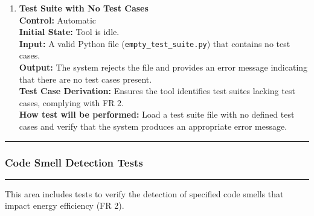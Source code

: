 \documentclass[12pt, titlepage]{article}
\newcommand{\colorrule}{\textcolor{BlueViolet}{\rule{\linewidth}{2pt}}}
\begin{document}
\begin{enumerate}[label={\bf \textcolor{Maroon}{test-FR-IA-\arabic*}}, wide=0pt, font=\itshape]
  \item \textbf{Test Suite with No Test Cases}\\[2mm]
    \textbf{Control:} Automatic \\
    \textbf{Initial State:} Tool is idle.\\
    \textbf{Input:} A valid Python file (\texttt{empty\_test\_suite.py}) that contains no test cases.\\
    \textbf{Output:} The system rejects the file and provides an error message indicating that there are no test cases present.\\[2mm]
    \textbf{Test Case Derivation:} Ensures the tool identifies test suites lacking test cases, complying with FR 2.\\[2mm]
    \textbf{How test will be performed:} Load a test suite file with no defined test cases and verify that the system produces an appropriate error message.
\end{enumerate}

\noindent
\colorrule

\subsubsection{Code Smell Detection Tests} \label{4.1.2}
\colorrule

\medskip

\noindent
This area includes tests to verify the detection of specified code 
smells that impact energy efficiency (FR 2).
\end{document}

